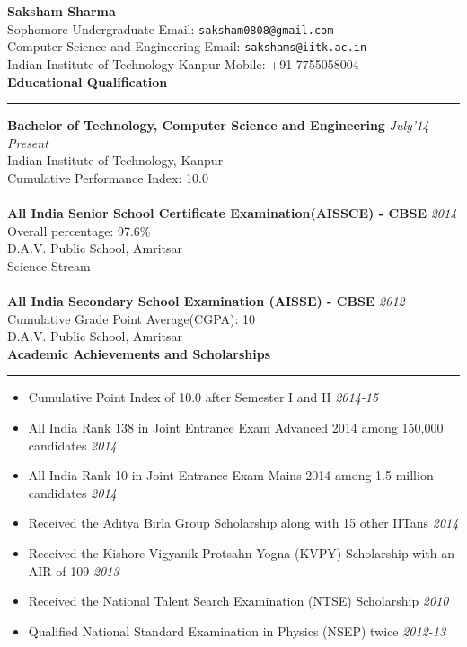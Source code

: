 \documentclass[11pt,a4paper]{article}
\begin{document}
\textbf{\huge{Saksham Sharma}}\\	%
Sophomore Undergraduate    \hfill Email: \texttt{saksham0808@gmail.com}\\
Computer Science and Engineering      \hfill  Email: \texttt{sakshams@iitk.ac.in}\\
Indian Institute of Technology Kanpur	\hfill Mobile: {+91-7755058004}\\


\textbf{\Large{Educational Qualification}}\\
\rule{\textwidth}{01pt}
\textbf{\large{Bachelor of Technology, Computer Science and Engineering}} \hfill\textit{ July'14-Present}\\
Indian Institute of Technology, Kanpur\\
Cumulative Performance Index: 10.0\\
\\
\textbf{\large{All India Senior School Certificate Examination(AISSCE) - CBSE}} \hfill\textit{ 2014}\\
Overall percentage: 97.6\%\\
D.A.V. Public School, Amritsar\\
Science Stream\\
\\
\textbf{\large{All India Secondary School Examination (AISSE) - CBSE}} \hfill\textit{ 2012}\\
Cumulative Grade Point Average(CGPA): 10\\
D.A.V. Public School, Amritsar\\

\textbf{\Large{Academic Achievements and Scholarships}}\\
\rule{\textwidth}{01pt}
\begin {itemize}
\item Cumulative Point Index of 10.0 after Semester I and II                                        \hfill \textit{2014-15}
\item All India Rank 138 in Joint Entrance Exam Advanced 2014 among 150,000 candidates            	\hfill \textit{2014}
\item All India Rank 10 in Joint Entrance Exam Mains 2014 among 1.5 million candidates              \hfill \textit{2014}
\item Received the Aditya Birla Group Scholarship along with 15 other IITans                        \hfill \textit{2014}
\item Received the Kishore Vigyanik Protsahn Yogna (KVPY) Scholarship with an AIR of 109            \hfill \textit{2013}
\item Received the National Talent Search Examination (NTSE) Scholarship                            \hfill \textit{2010}
\item Qualified National Standard Examination in Physics (NSEP) twice                               \hfill \textit{2012-13}
\end{itemize}
\end{document}
